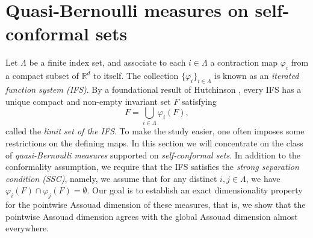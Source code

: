 \documentclass{PRM}
\newcommand{\field}[1]{\mathbb{#1}}
\newcommand{\R}{\field{R}}
\newcommand{\updim}{\overline{\dim}}
\newcommand{\adim}{\dim_{\mathrm{A}}}
\theoremstyle{plain}
\theoremstyle{definition}
\theoremstyle{remark}
\begin{document}


\section{Quasi-Bernoulli measures on self-conformal sets}\label{sec:qb-meas}
Let $\Lambda$ be a finite index set, and associate to each $i\in\Lambda$ a contraction map $\varphi_i$ from a compact subset of $\R^d$ to itself. The collection $\{\varphi_i\}_{i\in\Lambda}$ is known as an \emph{iterated function system (IFS)}. By a foundational result of Hutchinson \cite{H}, every IFS has a unique compact and non-empty invariant set $F$ satisfying
\begin{equation*}
    F=\bigcup_{i\in\Lambda}\varphi_i(F),
\end{equation*}
called the \emph{limit set of the IFS}. To make the study easier, one often imposes some restrictions on the defining maps. In this section we will concentrate on the class of \emph{quasi-Bernoulli measures} supported on \emph{self-conformal sets}. In addition to the conformality assumption, we require that the IFS satisfies the \emph{strong separation condition (SSC)}, namely, we assume that for any distinct $i,j\in\Lambda$, we have $\varphi_i(F)\cap \varphi_j(F)=\emptyset$. Our goal is to establish an exact dimensionality property for the pointwise Assouad dimension of these measures, that is, we show that the pointwise Assouad dimension agrees with the global Assouad dimension almost everywhere.
\end{document}
